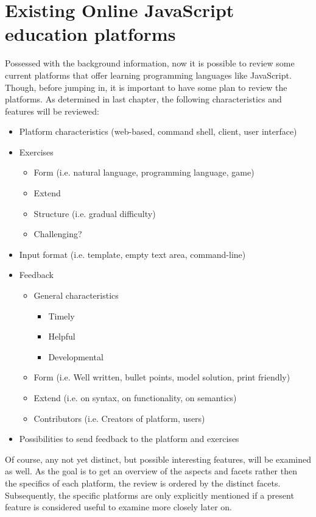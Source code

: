 \documentclass{article}
\begin{document}
\section{Existing Online JavaScript education platforms} 
Possessed with the background information, now it is possible to
review some current platforms that offer learning programming languages like 
JavaScript. Though, before jumping in, it is important to have some plan to
review the platforms. As determined in last chapter, the following 
characteristics and features will be reviewed:
\begin{itemize}
  \item Platform characteristics (web-based, command shell, client, user interface)
  \item Exercises
    \begin{itemize}
      \item Form (i.e. natural language, programming language, game)
	  \item Extend
	  \item Structure (i.e. gradual difficulty)
	  \item Challenging?
    \end{itemize}
  \item Input format (i.e. template, empty text area, command-line)
  \item Feedback
    \begin{itemize}
	  \item General characteristics
	    \begin{itemize}
          \item Timely
	      \item Helpful
	      \item Developmental
        \end{itemize}
	  \item Form (i.e. Well written, bullet points, model solution, print friendly)
	  \item Extend (i.e. on syntax, on functionality, on semantics)
	  \item Contributors (i.e. Creators of platform, users)
	\end{itemize}
  \item Possibilities to send feedback to the platform and exercises
\end{itemize}

Of course, any not yet distinct, but possible interesting features, 
will be examined as well. As the goal is to get an overview of the aspects and
facets rather then the specifics of each platform, the review is ordered by 
the distinct facets. Subsequently, the specific platforms are only
explicitly mentioned if
a present feature is considered useful to examine more closely later on.
\end{document}
